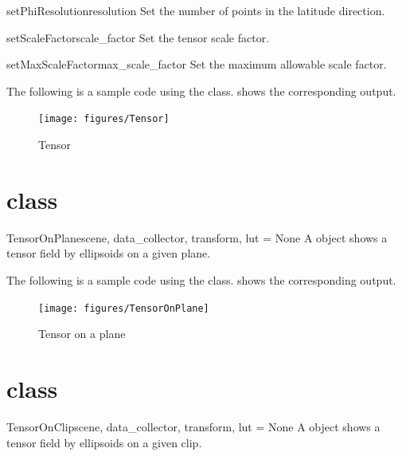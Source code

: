 \begin{methoddesc}[Tensor]{setPhiResolution}{resolution}
Set the number of points in the latitude direction.
\end{methoddesc}

\begin{methoddesc}[Tensor]{setScaleFactor}{scale_factor}
Set the tensor scale factor.
\end{methoddesc}

\begin{methoddesc}[Tensor]{setMaxScaleFactor}{max_scale_factor}
Set the maximum allowable scale factor.
\end{methoddesc}

The following is a sample code using the \TensorC class.
 shows the corresponding output.


\begin{figure}[ht]
\begin{center}
\texttt{[image: figures/Tensor]}
\end{center}
\caption{Tensor}
\label{fig:tensor.1}
\end{figure}

\section{\TensorOnPlane class}
\begin{classdesc}{TensorOnPlane}{scene, data_collector, transform, lut = None}
A \TensorOnPlane object shows a tensor field by ellipsoids on a given plane.
\end{classdesc}

The following is a sample code using the \TensorOnPlane class.
 shows the corresponding output.


\begin{figure}[ht]
\begin{center}
\texttt{[image: figures/TensorOnPlane]}
\end{center}
\caption{Tensor on a plane}
\label{fig:tensoronplane.1}
\end{figure}

\section{\TensorOnClip class}
\begin{classdesc}{TensorOnClip}{scene, data_collector, transform, lut = None}
A \TensorOnClip object shows a tensor field by ellipsoids on a given clip.
\end{classdesc}

